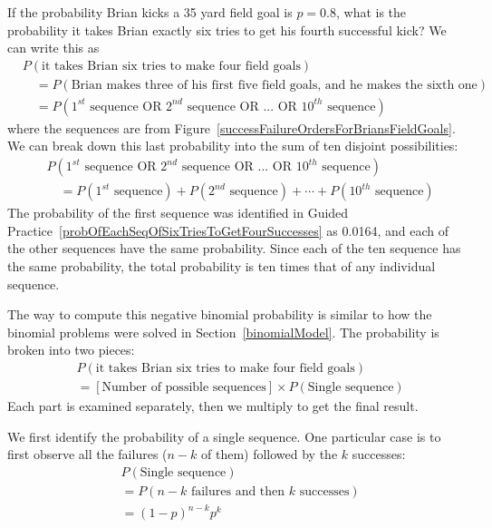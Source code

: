 If the probability Brian kicks a 35 yard field goal is $p=0.8$, what is the probability it takes Brian exactly six tries to get his fourth successful kick? We can write this as
{\small\begin{align*}
&P(\text{it takes Brian six tries to make four field goals}) \\
& \quad = P(\text{Brian makes three of his first five field goals, and he makes the sixth one}) \\
& \quad = P(\text{$1^{st}$ sequence OR $2^{nd}$ sequence OR ... OR $10^{th}$ sequence})
\end{align*}
}where the sequences are from Figure~\ref{successFailureOrdersForBriansFieldGoals}. We can break down this last probability into the sum of ten disjoint possibilities:
{\small\begin{align*}
&P(\text{$1^{st}$ sequence OR $2^{nd}$ sequence OR ... OR $10^{th}$ sequence}) \\
&\quad = P(\text{$1^{st}$ sequence}) + P(\text{$2^{nd}$ sequence}) + \cdots + P(\text{$10^{th}$ sequence})
\end{align*}
}The probability of the first sequence was identified in Guided Practice~\ref{probOfEachSeqOfSixTriesToGetFourSuccesses} as 0.0164, and each of the other sequences have the same probability. Since each of the ten sequence has the same probability, the total probability is ten times that of any individual sequence.

The way to compute this negative binomial probability is similar to how the binomial problems were solved in Section~\ref{binomialModel}. The probability is broken into two pieces:
\begin{align*}
&P(\text{it takes Brian six tries to make four field goals}) \\
&= [\text{Number of possible sequences}] \times P(\text{Single sequence})
\end{align*}
Each part is examined separately, then we multiply to get the final result.

We first identify the probability of a single sequence. One particular case is to first observe all the failures ($n-k$ of them) followed by the $k$ successes:
\begin{align*}
&P(\text{Single sequence}) \\
&= P(\text{$n-k$ failures and then $k$ successes}) \\
&= (1-p)^{n-k} p^{k}
\end{align*}

